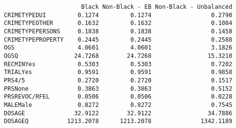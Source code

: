 \documentclass[
  letterpaper,
  DIV=11,
  numbers=noendperiod]{scrartcl}
\newenvironment{Shaded}{\begin{snugshade}}{\end{snugshade}}
\newcommand{\AttributeTok}[1]{\textcolor[rgb]{0.40,0.45,0.13}{#1}}
\newcommand{\DecValTok}[1]{\textcolor[rgb]{0.68,0.00,0.00}{#1}}
\newcommand{\FunctionTok}[1]{\textcolor[rgb]{0.28,0.35,0.67}{#1}}
\newcommand{\NormalTok}[1]{\textcolor[rgb]{0.00,0.23,0.31}{#1}}
\newcommand{\OtherTok}[1]{\textcolor[rgb]{0.00,0.23,0.31}{#1}}
\newcommand{\SpecialCharTok}[1]{\textcolor[rgb]{0.37,0.37,0.37}{#1}}
\newcommand{\StringTok}[1]{\textcolor[rgb]{0.13,0.47,0.30}{#1}}
\begin{document}
\begin{Shaded}
\end{Shaded}

\begin{verbatim}
                      Black Non-Black - EB Non-Black - Unbalanced
CRIMETYPEDUI         0.1274         0.1274                 0.2790
CRIMETYPEOTHER       0.1632         0.1632                 0.1084
CRIMETYPEPERSONS     0.1838         0.1838                 0.1458
CRIMETYPEPROPERTY    0.2445         0.2445                 0.2588
OGS                  4.0601         4.0601                 3.1826
OGSQ                24.7268        24.7268                15.3210
RECMINYes            0.5303         0.5303                 0.7202
TRIALYes             0.9591         0.9591                 0.9858
PRS4/5               0.2720         0.2720                 0.1517
PRSNone              0.3863         0.3863                 0.5152
PRSREVOC/RFEL        0.0506         0.0506                 0.0228
MALEMale             0.8272         0.8272                 0.7545
DOSAGE              32.9122        32.9122                34.7886
DOSAGEQ           1213.2078      1213.2078              1342.1189
\end{verbatim}

\begin{Shaded}
\end{Shaded}
\end{document}
